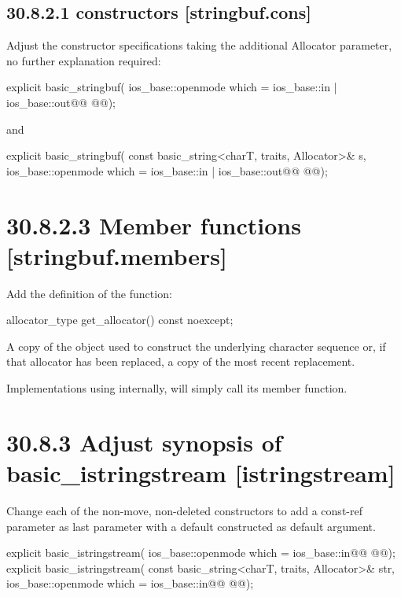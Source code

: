 \documentclass[ebook,11pt,article]{memoir}
\begin{document}
\subsection{30.8.2.1  constructors [stringbuf.cons]}
Adjust the constructor specifications taking the additional Allocator parameter, no further explanation required:

\begin{itemdecl}
explicit basic_stringbuf(
  ios_base::openmode which = ios_base::in | ios_base::out@\added{,}@
  @@);
\end{itemdecl}

and

\begin{itemdecl}
explicit basic_stringbuf(
  const basic_string<charT, traits, Allocator>& s,
  ios_base::openmode which = ios_base::in | ios_base::out@\added{,}@
  @@);
\end{itemdecl}

\section{30.8.2.3 Member functions [stringbuf.members]}
Add the definition of the  function:
\begin{addedblock}
\begin{itemdecl}
allocator_type get_allocator() const noexcept;
\end{itemdecl}

\begin{itemdescr}
\pnum
\returns
A copy of the
object used to construct the underlying character sequence or, if that allocator has been replaced, a
copy of the most recent replacement.
\begin{note}
Implementations using  internally, will simply call its  member function.
\end{note}

\end{itemdescr}
\end{addedblock}

\section{30.8.3 Adjust synopsis of basic\_istringstream [istringstream]}
Change each of the non-move, non-deleted constructors to add a const-ref  parameter as last parameter with a default constructed  as default argument. 
\begin{codeblock}
explicit basic_istringstream(
             ios_base::openmode which = ios_base::in@\added{,}@
             @@);
explicit basic_istringstream(
             const basic_string<charT, traits, Allocator>& str,
             ios_base::openmode which = ios_base::in@\added{,}@
             @@);
\end{codeblock}
\end{document}
